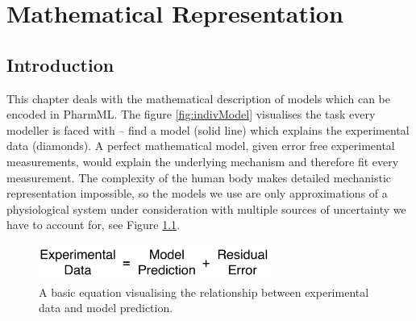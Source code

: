 \chapter{Mathematical Representation}
\label{chap:mathsdefn}


\section{Introduction}
This chapter deals with the mathematical description of models which can be 
encoded in PharmML. The figure \ref{fig:indivModel} visualises the task every 
modeller is faced with -- find a model (solid line) which explains the experimental 
data (diamonds). A perfect mathematical model, given error free experimental 
measurements, would explain the underlying mechanism and therefore fit every 
measurement. The complexity of the human body makes detailed mechanistic 
representation impossible, so the models we use are only approximations of a 
physiological system under consideration with multiple sources of uncertainty 
we have to account for, see Figure \ref{fig:basicEquation}.

\begin{figure}[htbp]
\centering
 \includegraphics[height=12mm]{pics/ModelEquation.pdf}
\caption{A basic equation visualising the relationship between experimental 
data and model prediction.}
\label{fig:basicEquation}
\end{figure}

